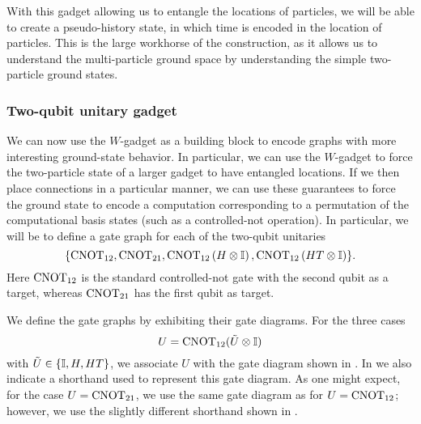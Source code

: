 \documentclass[../thesis-main/thesis-main]{subfiles}
\begin{document}
With this gadget allowing us to entangle the locations of particles, we will be able to create a pseudo-history state, in which time is encoded in the location of particles.  This is the large workhorse of the construction, as it allows us to understand the multi-particle ground space by understanding the simple two-particle ground states.



\subsubsection{Two-qubit unitary gadget}

We can now use the $W$-gadget as a building block to encode graphs with more interesting ground-state behavior.  In particular, we can use the $W$-gadget to force the two-particle state of a larger gadget to have entangled locations.  If we then place connections in a particular manner, we can use these guarantees to force the ground state to encode a computation corresponding to a permutation of the computational basis states (such as a controlled-not operation).  In particular, we will be to define a gate graph for each of the two-qubit unitaries
\begin{equation}
  \{\mathrm{CNOT}_{12}, \mathrm{CNOT}_{21}, \mathrm{CNOT}_{12}\left(H\otimes\mathbb{I}\right),
    \mathrm{CNOT}_{12}\left(HT\otimes\mathbb{I}\right)\}.
\end{equation}
Here $\mathrm{CNOT}_{12}$ is the standard controlled-not gate with the second qubit as a target, whereas $\mathrm{CNOT}_{21}$ has the first qubit as target.

We define the gate graphs by exhibiting their gate diagrams. For the three cases
\begin{equation}
  U=\mathrm{CNOT}_{12}(\tilde U\otimes\mathbb{I})
\end{equation}
with $\tilde U\in\{\mathbb{I},H,HT\}$, we associate $U$ with the gate diagram shown in . In  we also indicate a shorthand used to represent this gate diagram. As one might expect, for the case $U=\mathrm{CNOT}_{21}$, we use the same gate diagram as for $U=\mathrm{CNOT}_{12}$; however, we use the slightly different shorthand shown in .
\end{document}
